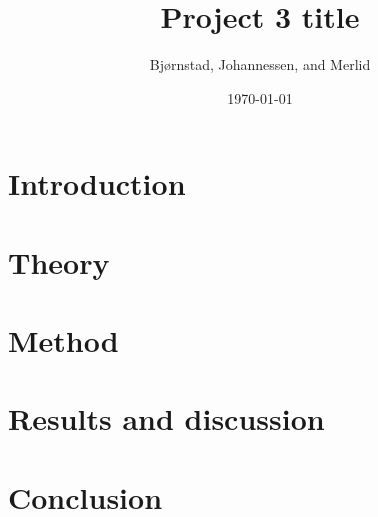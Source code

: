 \documentclass[aps,rmp,reprint,amsmath,amssymb,twocolumn,floatfix]{revtex4-1}
\begin{document}
\title{Project 3 title}

\author{Bjørnstad, Johannessen, and Merlid}
\date{\today}


\begin{abstract}

\end{abstract}
\maketitle

\tableofcontents

\section{Introduction}
\label{sec:introduction}

\section{Theory}


\section{Method}\label{sec:methods3}


\section{Results and discussion}\label{sec:results_and_discussion}


%

\section{Conclusion}\label{sec:conclucion5}


\clearpage
{} %


\clearpage
\appendix
\label{appendix}

\clearpage
\end{document}
